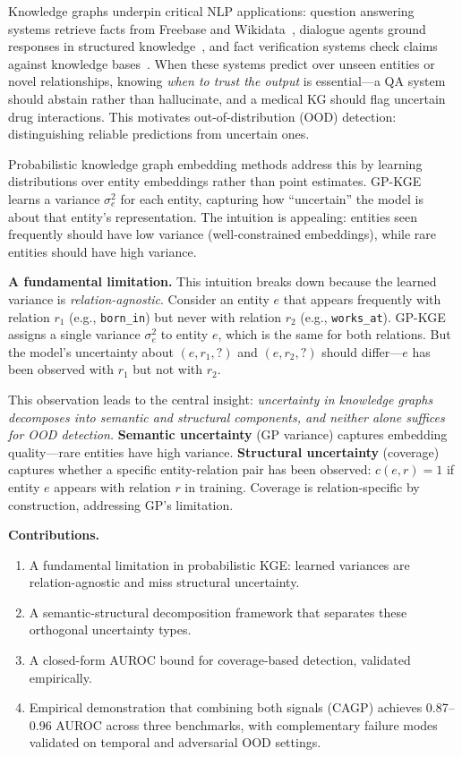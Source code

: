 
Knowledge graphs underpin critical NLP applications: question answering systems retrieve facts from Freebase and Wikidata~\citep{bordes2015large}, dialogue agents ground responses in structured knowledge~\citep{moon2019opendialkg}, and fact verification systems check claims against knowledge bases~\citep{thorne2018fever}.
When these systems predict over unseen entities or novel relationships, knowing \emph{when to trust the output} is essential---a QA system should abstain rather than hallucinate, and a medical KG should flag uncertain drug interactions.
This motivates out-of-distribution (OOD) detection: distinguishing reliable predictions from uncertain ones.

Probabilistic knowledge graph embedding methods address this by learning distributions over entity embeddings rather than point estimates.
GP-KGE~\citep{Chen2021PERM} learns a variance $\sigma^2_e$ for each entity, capturing how ``uncertain'' the model is about that entity's representation.
The intuition is appealing: entities seen frequently should have low variance (well-constrained embeddings), while rare entities should have high variance.

\textbf{A fundamental limitation.}
This intuition breaks down because the learned variance is \emph{relation-agnostic}.
Consider an entity $e$ that appears frequently with relation $r_1$ (e.g., \texttt{born\_in}) but never with relation $r_2$ (e.g., \texttt{works\_at}).
GP-KGE assigns a single variance $\sigma^2_e$ to entity $e$, which is the same for both relations.
But the model's uncertainty about $(e, r_1, ?)$ and $(e, r_2, ?)$ should differ---$e$ has been observed with $r_1$ but not with $r_2$.

This observation leads to the central insight: \emph{uncertainty in knowledge graphs decomposes into semantic and structural components, and neither alone suffices for OOD detection.}
\textbf{Semantic uncertainty} (GP variance) captures embedding quality---rare entities have high variance.
\textbf{Structural uncertainty} (coverage) captures whether a specific entity-relation pair has been observed: $c(e, r) = 1$ if entity $e$ appears with relation $r$ in training.
Coverage is relation-specific by construction, addressing GP's limitation.

\textbf{Contributions.}
\begin{enumerate}
    \item A fundamental limitation in probabilistic KGE: learned variances are relation-agnostic and miss structural uncertainty.
    \item A semantic-structural decomposition framework that separates these orthogonal uncertainty types.
    \item A closed-form AUROC bound for coverage-based detection, validated empirically.
    \item Empirical demonstration that combining both signals (CAGP) achieves 0.87--0.96 AUROC across three benchmarks, with complementary failure modes validated on temporal and adversarial OOD settings.
\end{enumerate}

